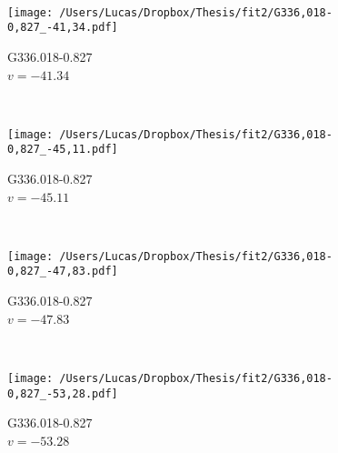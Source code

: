 \begin{figure*}[t]
\begin{subfigure}[t]{0.3\textwidth}
	\end{subfigure}
	~
	\begin{subfigure}[t]{0.3\textwidth}
		\texttt{[image: /Users/Lucas/Dropbox/Thesis/fit2/G336,018-0,827\_-41,34.pdf]}
		\caption[]{G336.018-0.827\\$v=-41.34$\,\kms}
	\end{subfigure}
	~
	\begin{subfigure}[t]{0.3\textwidth}
		\texttt{[image: /Users/Lucas/Dropbox/Thesis/fit2/G336,018-0,827\_-45,11.pdf]}
		\caption[]{G336.018-0.827\\$v=-45.11$\,\kms}
	\end{subfigure}
	~
	\begin{subfigure}[t]{0.3\textwidth}
		\texttt{[image: /Users/Lucas/Dropbox/Thesis/fit2/G336,018-0,827\_-47,83.pdf]}
		\caption[]{G336.018-0.827\\$v=-47.83$\,\kms}
	\end{subfigure}
	~
	\begin{subfigure}[t]{0.3\textwidth}
		\texttt{[image: /Users/Lucas/Dropbox/Thesis/fit2/G336,018-0,827\_-53,28.pdf]}
		\caption[]{G336.018-0.827\\$v=-53.28$\,\kms}
	\end{subfigure}
	~
\end{figure*}
\clearpage
